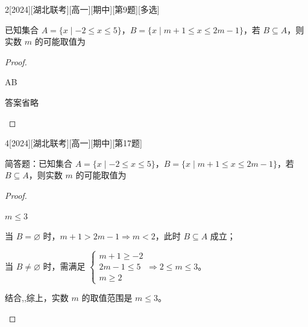 \documentclass[
showanswers,             %
answercolor=red,      %
numbercolor=purple      %
]{biscuits}
\begin{document}
\begin{example}{2}[2024][湖北联考][高一][期中][第9题][多选]
	
已知集合 $A=\{x\mid -2\le x\le 5\}$，$B=\{x\mid m+1\le x\le 2m-1\}$，若 $B\subseteq A$，则实数 $m$ 的可能取值为\blankbox
	\begin{choices}
	\end{choices}
	\begin{proof}
		
		\begin{answer}
			AB
		\end{answer}
		\begin{solutions}
			答案省略
		\end{solutions}
	\end{proof}
\end{example}
\begin{example}{4}[2024][湖北联考][高一][期中][第17题]
	
简答题：已知集合 $A=\{x\mid -2\le x\le 5\}$，$B=\{x\mid m+1\le x\le 2m-1\}$，若 $B\subseteq A$，则实数 $m$ 的可能取值为
	\begin{proof}
	
		\begin{answer}
			$m\le 3$
		\end{answer}
		\begin{solutions}
		\begin{quan}
			\item 当 $B=\varnothing$ 时，$m+1>2m-1 \Rightarrow m<2$，此时 $B\subseteq A$ 成立；
			\item 	当 $B\neq\varnothing$ 时，需满足 $\begin{cases} m+1\ge -2 \\ 2m-1\le 5 \\ m\ge 2 \end{cases} \Rightarrow 2\le m\le 3$。
		\end{quan}	
		
		结合,,综上，实数 $m$ 的取值范围是 $m\le 3$。
		\end{solutions}

	\end{proof}

\end{example}
\end{document}
